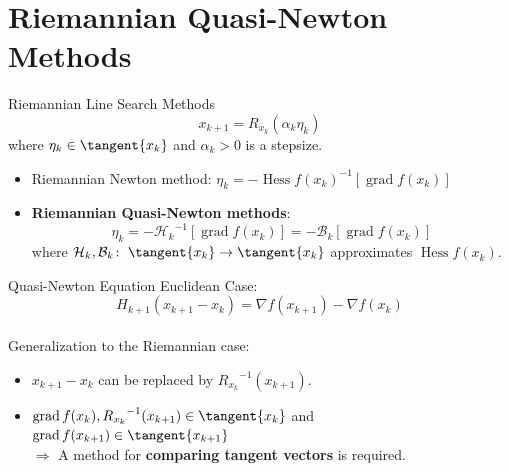 \documentclass[9.4pt]{beamer}
\begin{document}
\section{Riemannian Quasi-Newton Methods}

\begin{frame}{Riemannian Line Search Methods}
    \begin{equation*}
        x_{k+1} = R_{x_k}(\alpha_k \eta_k)
    \end{equation*}
    where $\eta_k \in \tangent{x_k}$ and $\alpha_k > 0$ is a stepsize. \\[1.\baselineskip]
    \begin{itemize}
        \item Riemannian Newton method: $\eta_k = - {\operatorname{Hess} f(x_k)}^{-1} [\operatorname{grad} f(x_k)]$
        \item \textbf{Riemannian Quasi-Newton methods}: \begin{equation*} \eta_k = - {\mathcal{H}_k}^{-1} [\operatorname{grad} f(x_k)] = - \mathcal{B}_k [\operatorname{grad} f(x_k)] \end{equation*} where $\mathcal{H}_k, \mathcal{B}_k \colon \; \tangent{x_k} \to \tangent{x_k}$ approximates $\operatorname{Hess} f(x_k)$. 
    \end{itemize}
\end{frame}


\begin{frame}{Quasi-Newton Equation}
    Euclidean Case: 
    \begin{equation*}
        H_{k+1} (x_{k+1} - x_k) = \nabla f(x_{k+1}) - \nabla f(x_k)
    \end{equation*} \\[.5\baselineskip]
    Generalization to the Riemannian case: \\[.5\baselineskip]
    \begin{itemize}
        \item $x_{k+1} - x_k$ can be replaced by ${R_{x_k}}^{-1}(x_{k+1})$.
        \item $\operatorname{grad} f(x_k), {R_{x_k}}^{-1}(x_{k+1}) \in \tangent{x_k}$ and $\operatorname{grad} f(x_{k+1}) \in \tangent{x_{k+1}}$ \\ $\Rightarrow$ A method for \textbf{comparing tangent vectors} is required. 
    \end{itemize}
\end{frame}
\end{document}

